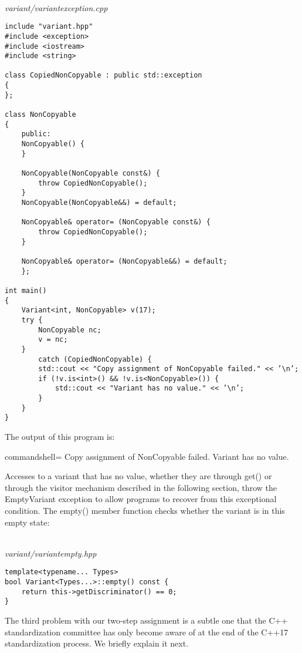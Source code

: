 \hspace*{\fill} \\ %
\noindent
\textit{variant/variantexception.cpp}
\begin{lstlisting}[style=styleCXX]
include "variant.hpp"
#include <exception>
#include <iostream>
#include <string>

class CopiedNonCopyable : public std::exception
{
};

class NonCopyable
{
	public:
	NonCopyable() {
	}

	NonCopyable(NonCopyable const&) {
		throw CopiedNonCopyable();
	}
	NonCopyable(NonCopyable&&) = default;
	
	NonCopyable& operator= (NonCopyable const&) {
		throw CopiedNonCopyable();
	}

	NonCopyable& operator= (NonCopyable&&) = default;
	};

int main()
{
	Variant<int, NonCopyable> v(17);
	try {
		NonCopyable nc;
		v = nc;
	}
		catch (CopiedNonCopyable) {
		std::cout << "Copy assignment of NonCopyable failed." << ’\n’;
		if (!v.is<int>() && !v.is<NonCopyable>()) {
			std::cout << "Variant has no value." << ’\n’;
		}
	}
}
\end{lstlisting}

The output of this program is:

\begin{tcblisting}{commandshell={}}
Copy assignment of NonCopyable failed.
Variant has no value.
\end{tcblisting}

Accesses to a variant that has no value, whether they are through get() or through the visitor mechanism described in the following section, throw the EmptyVariant exception to allow programs to recover from this exceptional condition. The empty() member function checks whether the variant is in this empty state:

\hspace*{\fill} \\ %
\noindent
\textit{variant/variantempty.hpp}
\begin{lstlisting}[style=styleCXX]
template<typename... Types>
bool Variant<Types...>::empty() const {
	return this->getDiscriminator() == 0;
}
\end{lstlisting}

The third problem with our two-step assignment is a subtle one that the C++ standardization committee has only become aware of at the end of the C++17 standardization process. We briefly explain it next.


